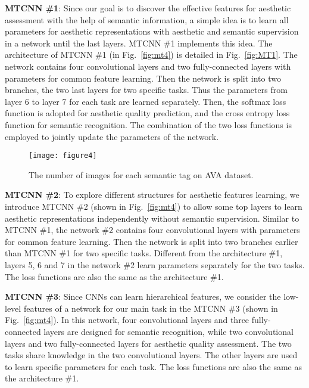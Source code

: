 \documentclass[journal]{IEEEtran}
\begin{document}
\textbf{MTCNN \#1}: Since our goal is to discover the effective features for aesthetic assessment with the help of semantic information, a simple idea is to learn all parameters for aesthetic representations with aesthetic and semantic supervision in a network until the last layers. MTCNN \#1 implements this idea. The architecture of MTCNN \#1 (in Fig.~\ref{fig:mt4}) is detailed in Fig.~\ref{fig:MT1}. The network contains four convolutional layers and two fully-connected layers with parameters  for common feature learning. Then the network is split into two branches, the two last layers for two specific tasks. Thus the parameters  from layer 6 to layer 7 for each task are learned separately. Then, the softmax loss function is adopted for aesthetic quality prediction, and the cross entropy loss function for semantic recognition. The combination of the two loss functions is employed to jointly update the parameters of the network.
\begin{figure*}
  \centering
\texttt{[image: figure4]}\\
  \vspace{-1em}
  \caption{The number of images for each semantic tag on AVA dataset.} \label{fig:NI}
\end{figure*}

\textbf{MTCNN \#2}: To explore different structures for aesthetic features learning, we introduce MTCNN \#2 (shown in Fig.~\ref{fig:mt4}) to allow some top layers to learn aesthetic representations independently without semantic supervision. Similar to MTCNN \#1, the network \#2 contains four convolutional layers with parameters  for common feature learning. Then the network is split into two branches earlier than MTCNN \#1 for two specific tasks. Different from the architecture \#1, layers 5, 6 and 7 in the network \#2 learn parameters  separately for the two tasks. The loss functions are also the same as the architecture \#1.

\textbf{MTCNN \#3}: Since CNNs can learn hierarchical features, we consider the low-level features of a network for our main task in the MTCNN \#3 (shown in Fig.~\ref{fig:mt4}). In this network, four convolutional layers and three fully-connected layers are designed for semantic recognition, while two convolutional layers and two fully-connected layers for aesthetic quality assessment. The two tasks share knowledge  in the two convolutional layers. The other layers are used to learn specific parameters  for each task. The loss functions are also the same as the architecture \#1.
\end{document}
